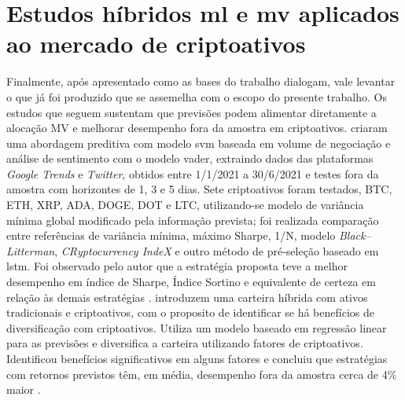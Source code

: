 


\section{Estudos híbridos \acl{ml} e \acs{mv} aplicados ao mercado de criptoativos}
\label{sec_estudos_hibridos_machine_learning_e_media_variancia_aplicados_ao_mercado_de_criptoativos}
Finalmente, após apresentado como as bases do trabalho dialogam, vale levantar o que já foi produzido que se assemelha com o escopo do presente trabalho. Os estudos que seguem sustentam que previsões podem alimentar diretamente a alocação MV e melhorar desempenho fora da amostra em criptoativos.  criaram uma abordagem preditiva com modelo \acs{svm} baseada em volume de negociação e análise de sentimento com o modelo \ac{vader}, extraindo dados das plataformas \textit{Google Trends} e \textit{Twitter}, obtidos entre 1/1/2021 a 30/6/2021 e testes fora da amostra com horizontes de 1, 3 e 5 dias. Sete criptoativos foram testados, BTC, ETH, XRP, ADA, DOGE, DOT e LTC, utilizando-se  modelo de variância mínima global modificado pela informação prevista; foi realizada comparação entre referências de variância mínima, máximo Sharpe, 1/N, modelo \textit{Black–Litterman}, \textit{CRyptocurrency IndeX} e outro método de pré-seleção baseado em \acs{lstm}. Foi observado pelo autor que a estratégia proposta teve a melhor desempenho em índice de Sharpe, Índice Sortino e equivalente de certeza em relação às demais estratégias \cite{zhou2023multisource}.  introduzem uma carteira híbrida com ativos tradicionais e criptoativos, com o proposito de identificar se há benefícios de diversificação com criptoativos. Utiliza um modelo baseado em regressão linear para as previsões e diversifica a carteira utilizando fatores de criptoativos. Identificou benefícios significativos em alguns fatores e concluiu que estratégias com retornos previstos têm, em média, desempenho fora da amostra cerca de 4\% maior \cite{han2024diversification}. 

